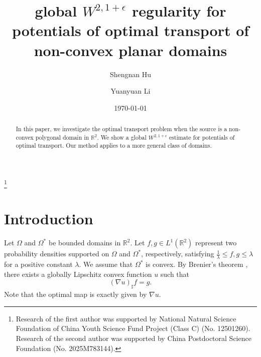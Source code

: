 \documentclass[11pt]{amsart}
\theoremstyle{plain}
\newcommand{\0}{\textbf{0}}
\numberwithin{equation}{section}
\numberwithin{equation}{section}
\numberwithin{figure}{section}
\begin{document}
	
	\title[$W^{2,1+\epsilon}$ estimates for potentials of optimal transport ]{\textbf{global $W^{2,1+\epsilon}$ regularity for potentials of optimal transport of non-convex planar domains}}
	
\author[S. Hu]
{Shengnan Hu}
\address{Shengnan Hu, MOE-LCSM, School of Mathematics and Statistics, Hunan Normal University, Changsha, Hunan 410081, P. R. China}


\author[Y. Li]{Yuanyuan Li}
\address{Yuanyuan Li, Institute for Theoretical Sciences, Westlake University, Hangzhou, 310030, China.}



\thanks{Research of the first author was supported by National Natural Science Foundation of China Youth Science Fund Project (Class C) (No. 12501260). Research of the second author was supported by China Postdoctoral Science Foundation (No. 2025M783144).
}	
	


\date{\today}





\dedicatory{}

\keywords{}
	\begin{abstract} 
		In this paper, we investigate the optimal transport problem when the source is a non-convex polygonal domain in $\mathbb{R}^2$. We show a global $W^{2,1+\epsilon}$ estimate for potentials of optimal transport. Our method applies to a more general class of domains.
	\end{abstract}
	
	\maketitle
	
	\baselineskip=16.4pt
	\parskip=3pt
	
	\section{Introduction}
	Let $\Omega$ and $\Omega^*$ be bounded domains in $\mathbb{R}^2$. Let $f, g \in L^1(\mathbb{R}^2)$ represent two probability densities supported on $\Omega$ and $\Omega^*$, respectively, satisfying $\frac{1}{\lambda} \leq f, g \leq \lambda$ for a positive constant $\lambda$. We assume that $\Omega^*$ is convex. By Brenier's theorem \cite{Br1},
	there exists a globally Lipschitz convex function $u$ such that
	\begin{equation}\label{be1}
		(\nabla u)_\sharp f=g.
	\end{equation}
	Note that the optimal map is exactly given by $\nabla u.$
	
\end{document}
